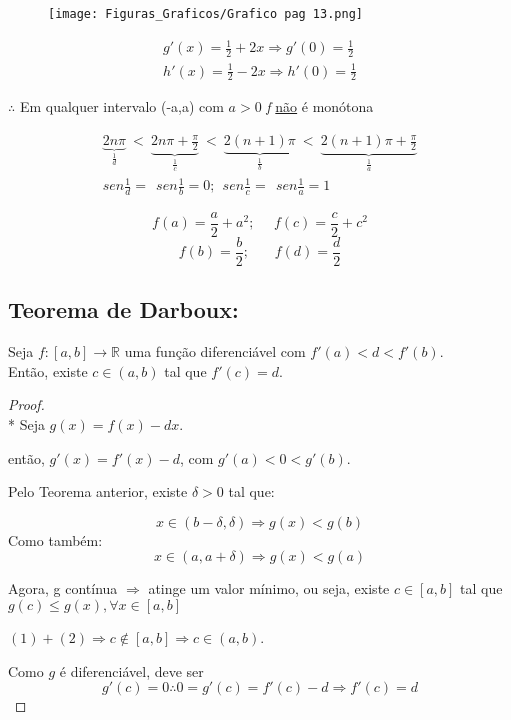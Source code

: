 \documentclass{article}
\begin{document}
\begin{figure}[H]
    \centering
    \texttt{[image: Figuras\_Graficos/Grafico pag 13.png]}
\end{figure}

\begin{align*}
    g'(x) = \frac{1}{2} + 2x \Rightarrow g'(0) = \frac{1}{2}\\
    h'(x) = \frac{1}{2} - 2x \Rightarrow h'(0) = \frac{1}{2}
\end{align*}

$\therefore$ Em qualquer intervalo (-a,a) com $a>0$ \textit{f} \underline{não} é monótona   

\begin{align*}
    \underbrace{2n \pi}_{\frac{1}{d}} \ < \ \underbrace{2n\pi + \frac{\pi}{2}}_{\frac{1}{c}} \ < \ \underbrace{2(n+1) \pi}_{\frac{1}{b}} \ < \ \underbrace{2(n+1) \pi + \frac{\pi}{2}}_{\frac{1}{a}}\\
    sen \frac{1}{d} = \ \ sen \frac{1}{b} = 0; \ \  sen \frac{1}{c} = \ \ sen \frac{1}{a} = 1
\end{align*}

\[f(a) = \frac{a}{2} + a^2; \ \ \ \ \ \ f(c) = \frac{c}{2} + c^2\]
\[f(b) = \frac{b}{2}; \ \ \ \ \ \ \ \ f(d) = \frac{d}{2}   \]

\pagebreak

\subsection*{Teorema de Darboux:}

Seja $f: [a, b] \rightarrow \mathbb{R}$ uma função diferenciável com $f'(a) < d < f'(b)$.\\
Então, existe $c \in (a, b)$ tal que $f'(c) = d$.

\begin{proof}\mbox{}\\*
Seja $g(x) = f(x) - dx$.

então, $ g'(x) = f'(x) - d$, com $g'(a)<0<g'(b)$.

Pelo Teorema anterior, existe $\delta > 0$ tal que:

\[
x \in (b-\delta,\delta) \Rightarrow g(x) < g(b)
\]
Como também:
\[
x \in (a,a+\delta) \Rightarrow  g(x) < g(a)
\]

Agora, g contínua $\Rightarrow$ atinge um valor mínimo, ou seja, existe $c \in [a,b]$ tal que $g(c) \leq g(x), \forall x \in [a,b]$

\begin{center}
$(1) + (2) \Rightarrow c \notin [a,b] \Rightarrow c \in (a,b)$.
\end{center}

Como $g$ é diferenciável, deve ser 
\[
g'(c) = 0 \therefore 0 = g'(c) = f'(c) - d \Rightarrow f'(c) = d
\]
\end{proof}
\end{document}
